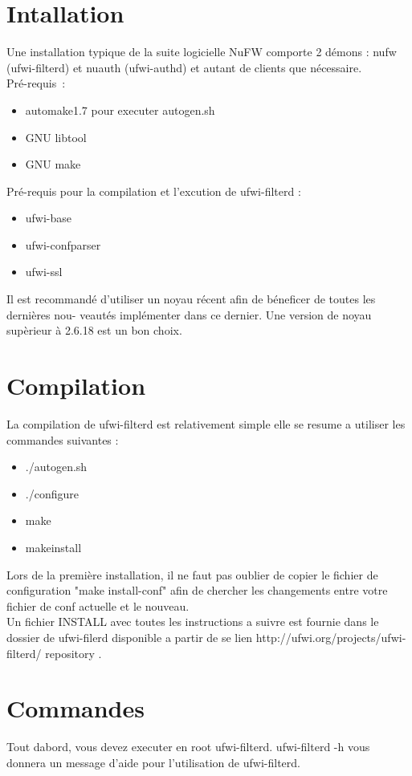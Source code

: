 \documentclass[12pt]{report}
\begin{document}
\begin{itemize}
\section{Intallation}
Une installation typique de la suite logicielle NuFW comporte 2 démons : nufw (ufwi-filterd) et nuauth (ufwi-authd) et autant de clients que nécessaire.\\
Pré-requis :
\begin{itemize}
  \item automake1.7 pour executer autogen.sh
  \item GNU libtool
  \item GNU make
\end{itemize}
Pré-requis pour la compilation et l'excution de ufwi-filterd :
\begin{itemize}
  \item ufwi-base
  \item ufwi-confparser
  \item ufwi-ssl
\end{itemize}
Il est recommandé d'utiliser un noyau récent afin de béneficer de toutes les dernières nou-
veautés implémenter dans ce dernier. Une version de noyau supèrieur à 2.6.18 est un bon choix.
\newpage
\section{Compilation}
La compilation de ufwi-filterd est relativement simple elle se resume a utiliser les commandes suivantes :
\begin{itemize}
  \item ./autogen.sh
  \item ./configure
  \item make
  \item makeinstall
\end{itemize}
Lors de la première installation, il ne faut pas oublier de copier le fichier de configuration "make install-conf" afin de chercher les changements entre votre fichier de conf actuelle et le nouveau.\\
Un fichier INSTALL avec toutes les instructions a suivre est fournie dans le dossier de ufwi-filerd disponible a partir de se lien http://ufwi.org/projects/ufwi-filterd/ repository .
\section{Commandes}
Tout dabord, vous devez executer en root ufwi-filterd.
ufwi-filterd -h vous donnera un message d'aide pour l'utilisation de ufwi-filterd.

\end{itemize}
\end{document}
